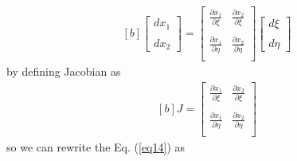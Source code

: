 \documentclass[]{article}
\begin{document}
\begin{equation}\label{eq15}
	\begin{aligned}[b]
		\begin{bmatrix}
			dx_{1}\\
			\\
			dx_{2}  
		\end{bmatrix}
		= \begin{bmatrix}
			\frac{\partial x_{1}}{\partial \xi}       & \frac{\partial x_{2}}{\partial \xi} \\
			\\
			\frac{\partial x_{1}}{\partial \eta}       &\frac{\partial x_{2}}{\partial \eta}\\
		\end{bmatrix}
		\begin{bmatrix}
			d \xi\\
			\\
			d \eta
		\end{bmatrix}
	\end{aligned}
\end{equation}
%
by defining Jacobian as
\begin{equation}\label{eq16}
	\begin{aligned}[b]
		J = \begin{bmatrix}
			\frac{\partial x_{1}}{\partial \xi}       & \frac{\partial x_{2}}{\partial \xi} \\
			\\
			\frac{\partial x_{1}}{\partial \eta}       &\frac{\partial x_{2}}{\partial \eta}\\
		\end{bmatrix}
	\end{aligned}
\end{equation}
so we can rewrite the Eq. (\ref{eq14}) as
\end{document}

